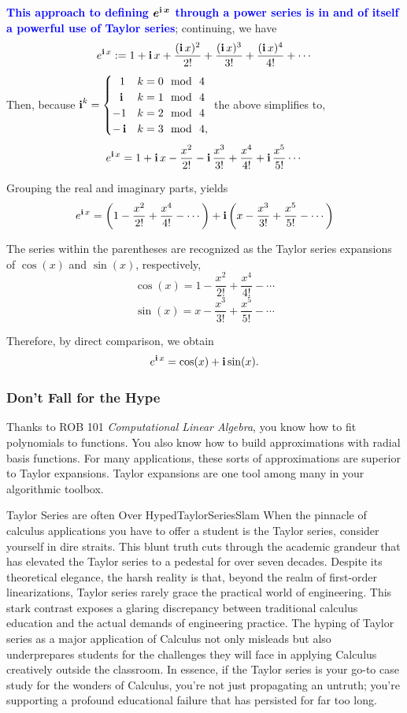 \textcolor{blue}{\bf This approach to defining $\bm{e^{\mathop{\bm{\mathrm i}} x}}$ through a power series is in and of itself a powerful use of Taylor series}; continuing, we have 
\[
e^{\mathop{\bm{\mathrm i}} x} := 1 + \mathop{\bm{\mathrm i}} x + \frac{(\mathop{\bm{\mathrm i}} x)^2}{2!} + \frac{(\mathop{\bm{\mathrm i}} x)^3}{3!} + \frac{(\mathop{\bm{\mathrm i}} x)^4}{4!} + \cdots
\]
Then, because $\mathop{\bm{\mathrm i}}^k = \begin{cases}
    ~~1 & k = 0~~{\rm mod}~~ 4\\
   ~~\mathop{\bm{\mathrm i}} & k = 1~~{\rm mod} ~~4\\
   -1 & k = 2~~{\rm mod} ~~4\\
   -\mathop{\bm{\mathrm i}} & k = 3~~{\rm mod}~~ 4,\\
\end{cases}$
the above simplifies to,
\[
e^{\mathop{\bm{\mathrm i}} x} = 1 + \mathop{\bm{\mathrm i}} x - \frac{x^2}{2!} - \mathop{\bm{\mathrm i}} \frac{x^3}{3!} + \frac{x^4}{4!} + \mathop{\bm{\mathrm i}} \frac{x^5}{5!} \cdots
\]

Grouping the real and imaginary parts, yields
\[
e^{\mathop{\bm{\mathrm i}} x} = \left(1 - \frac{x^2}{2!} + \frac{x^4}{4!} - \cdots\right) + \mathop{\bm{\mathrm i}} \left(x - \frac{x^3}{3!} + \frac{x^5}{5!} - \cdots\right)
\]

The series within the parentheses are recognized as the Taylor series expansions of \(\cos(x)\) and \(\sin(x)\), respectively,
\[
\cos(x) = 1 - \frac{x^2}{2!} + \frac{x^4}{4!} - \cdots
\]
\[
\sin(x) = x - \frac{x^3}{3!} + \frac{x^5}{5!} - \cdots
\]

Therefore, by direct comparison, we obtain
\[
e^{\mathop{\bm{\mathrm i}} x} = \cos(x) + \mathop{\bm{\mathrm i}} \sin(x).
\]
\Qed

\subsubsection{Don't Fall for the Hype}

 Thanks to ROB 101 \textit{Computational Linear Algebra}, you know how to fit polynomials to functions. You also know how to build approximations with radial basis functions. For many applications, these sorts of approximations are superior to Taylor expansions. Taylor expansions are one tool among many in your algorithmic toolbox. \\

 \begin{funColor}{Taylor Series are often Over Hyped}{TaylorSeriesSlam}
 When the pinnacle of calculus applications you have to offer a student is the Taylor series, consider yourself in dire straits. This blunt truth cuts through the academic grandeur that has elevated the Taylor series to a pedestal for over seven decades. Despite its theoretical elegance, the harsh reality is that, beyond the realm of first-order linearizations, Taylor series rarely grace the practical world of engineering. This stark contrast exposes a glaring discrepancy between traditional calculus education and the actual demands of engineering practice. The hyping of Taylor series as a major application of Calculus not only misleads but also underprepares students for the challenges they will face in applying Calculus creatively outside the classroom. In essence, if the Taylor series is your go-to case study for the wonders of Calculus, you're not just propagating an untruth; you're supporting a profound educational failure that has persisted for far too long.
 \end{funColor}

